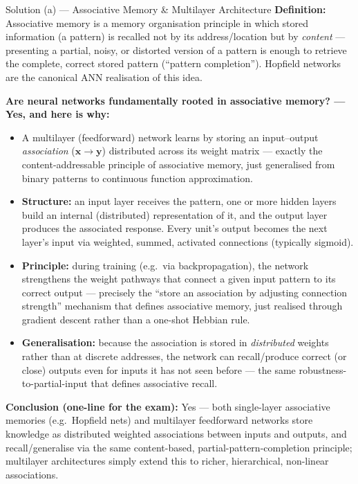 \documentclass[12pt,a4paper]{article}
\begin{document}
\begin{solbox}{Solution (a) --- Associative Memory \& Multilayer Architecture}
\textbf{Definition:} Associative memory is a memory organisation principle in which stored information (a pattern) is recalled not by its address/location but by \emph{content} --- presenting a partial, noisy, or distorted version of a pattern is enough to retrieve the complete, correct stored pattern (``pattern completion''). Hopfield networks are the canonical ANN realisation of this idea.

\textbf{Are neural networks fundamentally rooted in associative memory? --- Yes, and here is why:}
\begin{itemize}[noitemsep]
  \item A multilayer (feedforward) network learns by storing an input--output \emph{association} ($\mathbf{x} \to \mathbf{y}$) distributed across its weight matrix --- exactly the content-addressable principle of associative memory, just generalised from binary patterns to continuous function approximation.
  \item \textbf{Structure:} an input layer receives the pattern, one or more hidden layers build an internal (distributed) representation of it, and the output layer produces the associated response. Every unit's output becomes the next layer's input via weighted, summed, activated connections (typically sigmoid).
  \item \textbf{Principle:} during training (e.g.\ via backpropagation), the network strengthens the weight pathways that connect a given input pattern to its correct output --- precisely the ``store an association by adjusting connection strength'' mechanism that defines associative memory, just realised through gradient descent rather than a one-shot Hebbian rule.
  \item \textbf{Generalisation:} because the association is stored in \emph{distributed} weights rather than at discrete addresses, the network can recall/produce correct (or close) outputs even for inputs it has not seen before --- the same robustness-to-partial-input that defines associative recall.
\end{itemize}
\textbf{Conclusion (one-line for the exam):} Yes --- both single-layer associative memories (e.g.\ Hopfield nets) and multilayer feedforward networks store knowledge as distributed weighted associations between inputs and outputs, and recall/generalise via the same content-based, partial-pattern-completion principle; multilayer architectures simply extend this to richer, hierarchical, non-linear associations.
\end{solbox}
\end{document}
